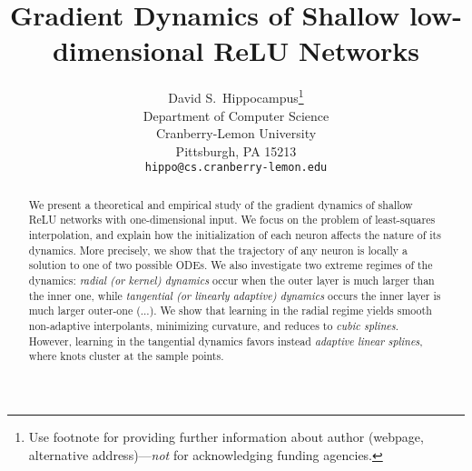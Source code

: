 \documentclass{article}
\title{Gradient Dynamics of Shallow low-dimensional ReLU Networks}
\author{%
  David S.~Hippocampus\thanks{Use footnote for providing further information
    about author (webpage, alternative address)---\emph{not} for acknowledging
    funding agencies.} \\
  Department of Computer Science\\
  Cranberry-Lemon University\\
  Pittsburgh, PA 15213 \\
  \texttt{hippo@cs.cranberry-lemon.edu} \\
}
\newcommand{\todo}[1]{{\color{red} #1 }}
\begin{document}
\maketitle

\begin{abstract}
We present a theoretical and empirical study of the gradient dynamics of shallow ReLU networks with one-dimensional input. We focus on the problem of least-squares interpolation, and explain how the initialization of each neuron affects the nature of its dynamics. More precisely, we show that the trajectory of any neuron is locally a solution to one of two possible ODEs. We also investigate two extreme regimes of the dynamics: \emph{radial (or kernel) dynamics} occur when the outer layer is much larger than the inner one, while \emph{tangential (or linearly adaptive) dynamics} occurs the inner layer is much larger outer-one (...). We show that learning in the radial regime yields smooth non-adaptive interpolants, minimizing curvature, and reduces to \emph{cubic splines}. However, learning in the tangential dynamics favors instead \emph{adaptive linear splines}, where knots cluster at the sample points.




\end{abstract}







{}

\newpage
\appendix

\end{document}

